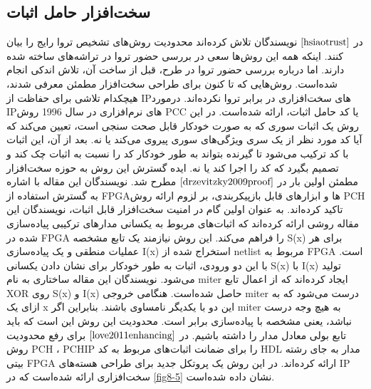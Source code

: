 \subsection {سخت‌افزار حامل اثبات}
در $\cite{hsiaotrust}$ نویسندگان تلاش کرده‌اند محدودیت روش‌های تشخیص تروا رایج را بیان کنند. اینکه همه این روش‌ها سعی در بررسی حضور تروا در تراشه‌های ساخته شده دارند. اما درباره بررسی حضور تروا در طرح، قبل از ساخت آن، تلاش اندکی انجام شده‌است. روش‌هایی که تا کنون برای طراحی سخت‌افزار مطمئن معرفی شدند، هیچکدام تلاشی برای حفاظت از IP‌ها‌‌ی سخت‌افزاری در برابر تروا نکرده‌اند. درمورد IP‌ها‌‌ی نرم‌افزاری در سال 1996 روش PCC یا کد حامل اثبات، ارائه شده‌است. در این روش یک اثبات سوری که به صورت خودکار قابل صحت سنجی است، تعیین می‌کند که آیا کد مورد نظر از یک سری ویژگی‌های سوری پیروی می‌کند یا نه. بعد از آن، این اثبات با کد ترکیب می‌شود تا گیرنده بتواند به طور خودکار کد را نسبت به اثبات چک کند و تصمیم بگیرد که کد را اجرا کند یا نه.
ایده گسترش این روش به حوزه سخت‌افزار مطمئن اولین بار در $\cite{drzevitzky2009proof}$ مطرح شد. نویسندگان این مقاله با اشاره به گسترش استفاده از FPGA‌ها‌‌ و ابزارهای قابل بازپیکربندی، بر لزوم ارائه روش PCH تاکید کرده‌اند. به عنوان اولین گام در امنیت سخت‌افزار قابل اثبات، نویسندگان این مقاله روشی ارائه کرده‌اند که اثبات‌های مربوط به یکسانی مدارهای ترکیبی پیاده‌سازی شده در FPGA را فراهم می‌کند. این روش نیازمند یک تابع مشخصه S(x) برای هر عملیات منطقی و یک پیاده‌سازی I(x) استخراج شده از netlist مربوط به FPGA است. با این دو ورودی، اثبات به طور خودکار برای نشان دادن یکسانی S(x) با I(x) تولید می‌شود. نویسندگان این مقاله ساختاری به نام miter ایجاد کرده‌اند که از اعمال تابع XOR روی S(x) و I(x) حاصل شده‌است. هنگامی خروجی miter درست می‌شود که به ازای یک x این دو با یکدیگر نامساوی باشند. بنابراین اگر miter به هیچ وجه درست نباشد، یعنی مشخصه با پیاده‌سازی برابر است. محدودیت این روش این است که باید تابع بولی معادل مدار را داشته باشیم.
در $\cite{love2011enhancing}$ برای رفع محدودیت روش PCH ، PCHIP را برای ضمانت اثبات‌های مربوط به کد HDL مدار به جای رشته بیتی FPGA ارائه کرده‌اند. در این روش یک پروتکل جدید برای طراحی هسته‌های IP سخت‌افزاری ارائه شده‌است که در \ref{fig8-5} نشان داده شده‌است.
